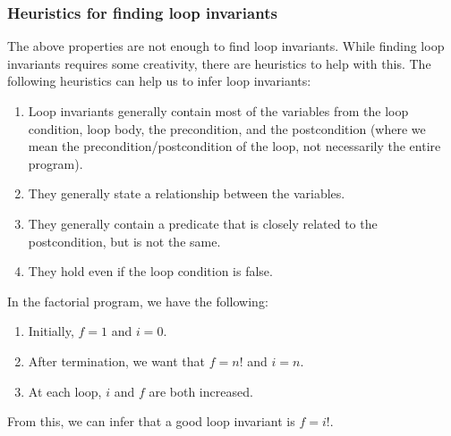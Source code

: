 \subsubsection*{Heuristics for finding loop invariants}

The above properties are not enough to find loop invariants. While finding loop invariants requires some creativity, there are heuristics to help with this. The following heuristics can help us to infer loop invariants:

\begin{enumerate}

 \item Loop invariants generally contain most of the variables from the loop condition, loop body, the precondition, and the postcondition (where we mean the precondition/postcondition of the loop, not necessarily the entire program).

 \item They generally state a relationship between the variables.

 \item They generally contain a predicate that is closely related to the postcondition, but is not the same.

 \item They hold even if the loop condition is false.

\end{enumerate}

\begin{example}
In the factorial program, we have the following:

\begin{enumerate}

 \item Initially, $f = 1$ and $i = 0$.

 \item After termination, we want that $f = n!$ and $i = n$.

 \item At each loop, $i$ and $f$ are both increased.

\end{enumerate}

From this, we can infer that a good loop invariant is $f = i!$.

\end{example}

